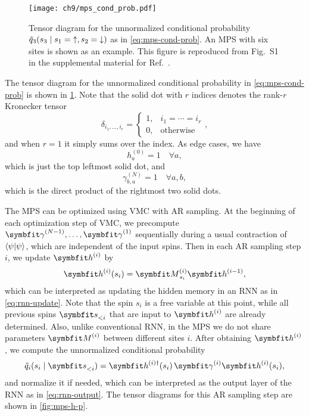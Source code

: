 \begin{figure}[htb]
\centering
\texttt{[image: ch9/mps\_cond\_prob.pdf]}
\caption[Tensor diagram for conditional probability in MPS]{
Tensor diagram for the unnormalized conditional probability $\tilde{q}_3(s_3 \mid s_1 = {\uparrow}, s_2 = {\downarrow})$ as in \cref{eq:mps-cond-prob}. An MPS with six sites is shown as an example.
This figure is reproduced from Fig.~S1 in the supplemental material for Ref.~\cite{wu2023tensor}.
}
\label{fig:mps-cond-prob}
\end{figure}

The tensor diagram for the unnormalized conditional probability in \cref{eq:mps-cond-prob} is shown in \cref{fig:mps-cond-prob}. Note that the solid dot with $r$ indices denotes the rank-$r$ Kronecker tensor
\begin{equation}
\delta_{i_1, \ldots, i_r} = \begin{cases}
1, & i_1 = \cdots = i_r \\
0, & \text{otherwise}
\end{cases},
\end{equation}
and when $r = 1$ it simply sums over the index. As edge cases, we have
\begin{equation}
h^{(0)}_a = 1 \quad \forall a,
\end{equation}
which is just the top leftmost solid dot, and
\begin{equation}
\gamma^{(N)}_{b, a} = 1 \quad \forall a, b,
\end{equation}
which is the direct product of the rightmost two solid dots.

The MPS can be optimized using VMC with AR sampling. At the beginning of each optimization step of VMC, we precompute $\mga^{(N - 1)}, \ldots, \mga^{(1)}$ sequentially during a usual contraction of $\ip{\psi}$, which are independent of the input spins. Then in each AR sampling step $i$, we update $\vh^{(i)}$ by
\begin{equation}
\vh^{(i)}(s_i) = \mM^{(i)}_{s_i} \vh^{(i - 1)},
\label{eq:mps-rnn-h}
\end{equation}
which can be interpreted as updating the hidden memory in an RNN as in \cref{eq:rnn-update}. Note that the spin $s_i$ is a free variable at this point, while all previous spins $\vs_{< i}$ that are input to $\vh^{(i)}$ are already determined. Also, unlike conventional RNN, in the MPS we do not share parameters $\mM^{(i)}$ between different sites $i$. After obtaining $\vh^{(i)}$, we compute the unnormalized conditional probability
\begin{equation}
\tilde{q}_i(s_i \mid \vs_{< i}) = \vh^{(i) \dagger}(s_i)\,\mga^{(i)} \vh^{(i)}(s_i),
\label{eq:mps-rnn-q}
\end{equation}
and normalize it if needed, which can be interpreted as the output layer of the RNN as in \cref{eq:rnn-output}. The tensor diagrams for this AR sampling step are shown in \cref{fig:mps-h-p}.


